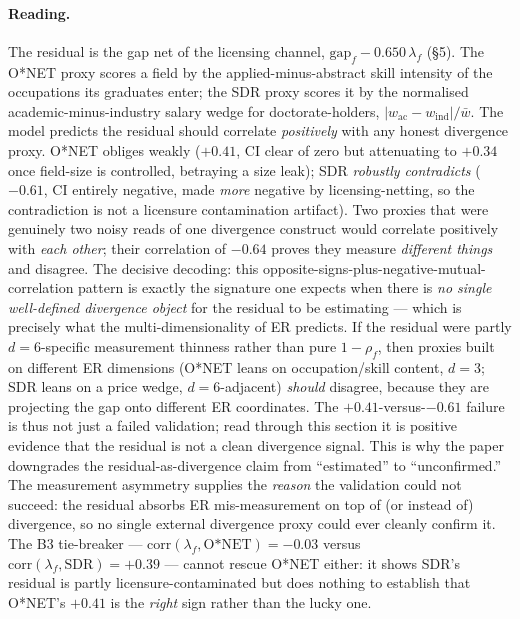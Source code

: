 \documentclass[11pt]{article}
\begin{document}
\paragraph{Reading.} The residual is the gap net of the licensing channel, $\mathrm{gap}_f - 0.650\,\lambda_f$ (\S5). The O*NET proxy scores a field by the applied-minus-abstract skill intensity of the occupations its graduates enter; the SDR proxy scores it by the normalised academic-minus-industry salary wedge for doctorate-holders, $|w_{\text{ac}}-w_{\text{ind}}|/\bar w$. The model predicts the residual should correlate \emph{positively} with any honest divergence proxy. O*NET obliges weakly ($+0.41$, CI clear of zero but attenuating to $+0.34$ once field-size is controlled, betraying a size leak); SDR \emph{robustly contradicts} ($-0.61$, CI entirely negative, made \emph{more} negative by licensing-netting, so the contradiction is not a licensure contamination artifact). Two proxies that were genuinely two noisy reads of one divergence construct would correlate positively with \emph{each other}; their correlation of $-0.64$ proves they measure \emph{different things} and disagree. The decisive decoding: this opposite-signs-plus-negative-mutual-correlation pattern is exactly the signature one expects when there is \emph{no single well-defined divergence object} for the residual to be estimating --- which is precisely what the multi-dimensionality of ER predicts. If the residual were partly $d{=}6$-specific measurement thinness rather than pure $1-\rho_f$, then proxies built on different ER dimensions (O*NET leans on occupation/skill content, $d{=}3$; SDR leans on a price wedge, $d{=}6$-adjacent) \emph{should} disagree, because they are projecting the gap onto different ER coordinates. The $+0.41$-versus-$-0.61$ failure is thus not just a failed validation; read through this section it is positive evidence that the residual is not a clean divergence signal. This is why the paper downgrades the residual-as-divergence claim from ``estimated'' to ``unconfirmed.'' The measurement asymmetry supplies the \emph{reason} the validation could not succeed: the residual absorbs ER mis-measurement on top of (or instead of) divergence, so no single external divergence proxy could ever cleanly confirm it. The B3 tie-breaker --- $\mathrm{corr}(\lambda_f,\text{O*NET})=-0.03$ versus $\mathrm{corr}(\lambda_f,\text{SDR})=+0.39$ --- cannot rescue O*NET either: it shows SDR's residual is partly licensure-contaminated but does nothing to establish that O*NET's $+0.41$ is the \emph{right} sign rather than the lucky one.
\end{document}

